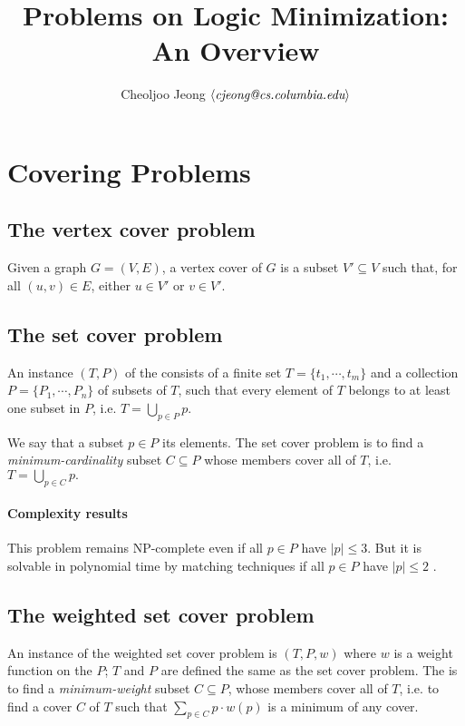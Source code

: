 \documentclass{note}
\begin{document}
\title{\large\bf Problems on Logic Minimization: An Overview}
\author{\normalsize{}Cheoljoo Jeong $\mbox{$\langle{\textit{\mbox{cjeong@cs.columbia.edu}}}\rangle$}$}
\maketitle

\section{Covering Problems}

\subsection{The vertex cover problem}
\begin{definition}
Given a graph $G = (V, E)$, a vertex cover of $G$ is a subset 
$V' \subseteq V$ such that, for all $(u, v) \in E$, either $u \in V'$
or $v \in V'$.
\end{definition}


\subsection{The set cover problem}
\begin{definition}
An instance $(T, P)$ of the  consists of a 
finite set $T = \{t_1, \cdots, t_m\}$ 
and a collection $P = \{P_1, \cdots, P_n\}$ 
of subsets of $T$, such that
every element of $T$ belongs to at least one subset in $P$, i.e.
$T = \bigcup_{p \in P} p$. 
\end{definition}
We say that a subset $p \in P$  its elements.
The set cover problem is to 
find a {\em minimum-cardinality\/} subset $C \subseteq P$
whose members cover all of $T$, i.e.
$T = \bigcup_{p \in C} p.$

\paragraph{Complexity results} This problem remains NP-complete 
even if all $p \in P$ have $|p| \leq 3$.
But it is solvable in polynomial time by matching techniques
if all $p \in P$ have $|p| \leq 2$ \cite[page 222]{GJ79}.

\subsection{The weighted set cover problem}
\begin{definition}
An instance of the weighted set cover problem is $(T, P, w)$ where
$w$ is a weight function on the $P$; $T$ and $P$ are defined 
the same as the set cover problem.
The  is to find a {\em minimum-weight}
subset $C \subseteq P$, whose members cover all of $T$, i.e.
to find a cover $C$ of $T$ such that 
$\sum_{p \in C}p\cdot{}w(p)$
is a minimum of any cover.
\end{definition}
\end{document}
